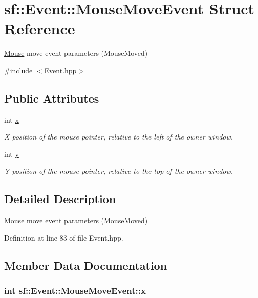 \hypertarget{structsf_1_1_event_1_1_mouse_move_event}{\section{sf\-:\-:Event\-:\-:Mouse\-Move\-Event Struct Reference}
\label{structsf_1_1_event_1_1_mouse_move_event}
}


\hyperlink{classsf_1_1_mouse}{Mouse} move event parameters (Mouse\-Moved)  




{\ttfamily \#include $<$Event.\-hpp$>$}

\subsection*{Public Attributes}
\begin{DoxyCompactItemize}
\item 
int \hyperlink{structsf_1_1_event_1_1_mouse_move_event_aa3a23809afb905cbb52c66d8512e21fd}{x}
\begin{DoxyCompactList}\small\item\em X position of the mouse pointer, relative to the left of the owner window. \end{DoxyCompactList}\item 
int \hyperlink{structsf_1_1_event_1_1_mouse_move_event_a86d78a2fba5b3abda16ca059f2392ad4}{y}
\begin{DoxyCompactList}\small\item\em Y position of the mouse pointer, relative to the top of the owner window. \end{DoxyCompactList}\end{DoxyCompactItemize}


\subsection{Detailed Description}
\hyperlink{classsf_1_1_mouse}{Mouse} move event parameters (Mouse\-Moved) 

Definition at line 83 of file Event.\-hpp.



\subsection{Member Data Documentation}
\hypertarget{structsf_1_1_event_1_1_mouse_move_event_aa3a23809afb905cbb52c66d8512e21fd}{
\subsubsection[{x}]{\setlength{\rightskip}{0pt plus 5cm}int sf\-::\-Event\-::\-Mouse\-Move\-Event\-::x}}\label{structsf_1_1_event_1_1_mouse_move_event_aa3a23809afb905cbb52c66d8512e21fd}



